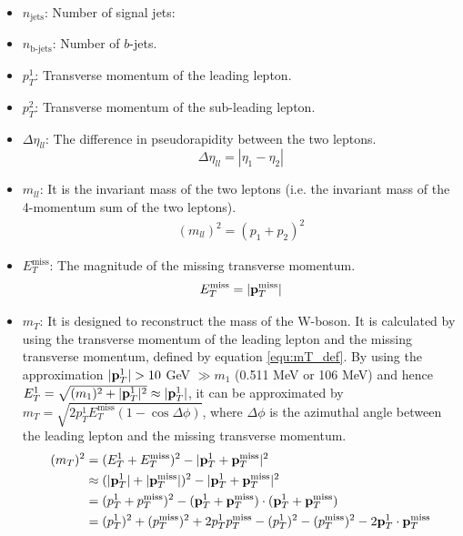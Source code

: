 \begin{itemize}
\item $n_{\text{jets}}$: Number of signal jets:
\item $n_{\text{b-jets}}$: Number of $b$-jets.
\item $p_T^1$: Transverse momentum of the leading lepton.
\item $p_T^2$: Transverse momentum of the sub-leading lepton.
\item $\Delta \eta_{ll}$:
The difference in pseudorapidity between the two leptons.
\begin{equation}
\Delta \eta_{ll} = |\eta_{1} - \eta_{2}|
\end{equation}
\item $m_{ll}$:
It is the invariant mass of the two leptons (i.e. the invariant mass of the 4-momentum sum of the two leptons).
\begin{align}
(m_{ll})^2 = (p_1 + p_2)^2
\end{align}
\item $E_{T}^{\text{miss}}$:
The magnitude of the missing transverse momentum.
\begin{equation}
E_{T}^{\text{miss}} = |{\bf p}_T^{\text{miss}}|
\end{equation}
\item $m_T$:
It is designed to reconstruct the mass of the W-boson.
It is calculated by using the transverse momentum of the leading lepton and the missing transverse momentum, defined by equation \ref{equ:mT_def}.
By using the approximation $|{\bf p}_T^1| > 10$ GeV $\gg m_1$ (0.511 MeV or 106 MeV) and hence $E_T^1 = \sqrt{ (m_1)^2 + |{\bf p}_T^1|^2 } \approx |{\bf p}_T^1| $, it can be approximated by $m_T = \sqrt{2p_T^1 E_T^{\text{miss}}(1-\cos{\Delta\phi})}$, where $\Delta\phi$ is the azimuthal angle between the leading lepton and the missing transverse momentum.
\begin{align}
(m_T)^2 &= ( E_T^1 + E_T^{\text{miss}} )^2 - |{\bf p}_T^1 + {\bf p}_T^{\text{miss}}|^2 \label{equ:mT_def}\\
& \approx (|{\bf p}_T^1| + |{\bf p}_T^{\text{miss}}|)^2 - |{\bf p}_T^1 + {\bf p}_T^{\text{miss}}|^2 \\
&= (p_T^1 +  p_T^{\text{miss}})^2 - ({\bf p}_T^1 + {\bf p}_T^{\text{miss}}) \cdot ({\bf p}_T^1 + {\bf p}_T^{\text{miss}}) \\
&= (p_T^1)^2 + (p_T^{\text{miss}})^2 + 2 p_T^1 p_T^{\text{miss}}
 - (p_T^1)^2 - (p_T^{\text{miss}})^2 - 2 {\bf p}_T^1  \cdot {\bf p}_T^{\text{miss}} \\

\end{align}
\end{itemize}
